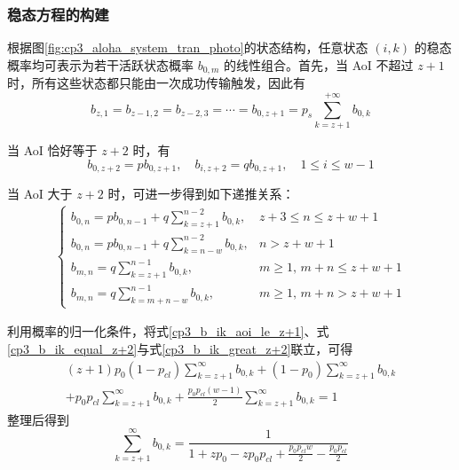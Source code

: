 \subsubsection{稳态方程的构建}

根据图\ref{fig:cp3_aloha_system_tran_photo}的状态结构，任意状态 $(i,k)$ 的稳态概率均可表示为若干活跃状态概率 $b_{0,m}$ 的线性组合。首先，当 AoI 不超过 $z+1$ 时，所有这些状态都只能由一次成功传输触发，因此有
\begin{equation} \label{cp3_b_ik_aoi_le_z+1}
    b_{z,1}=b_{z-1,2}=b_{z-2,3}=\cdots=b_{0,z+1}=p_s\sum_{k=z+1}^{+\infty}b_{0,k}
\end{equation}

当 AoI 恰好等于 $z+2$ 时，有
\begin{equation}\label{cp3_b_ik_equal_z+2}
    b_{0,z+2} = pb_{0,z+1},\quad b_{i,z+2}=qb_{0,z+1},\quad1\leq i \leq w-1
\end{equation}

当 AoI 大于 $z+2$ 时，可进一步得到如下递推关系：
\begin{equation}\label{cp3_b_ik_great_z+2}
\begin{gathered}
\begin{cases}
    \displaystyle b_{0,n} = p b_{0,n-1} + q \sum_{k=z+1}^{n-2} b_{0,k}, & z+3 \le n \le z+w+1 \\[12pt]
    \displaystyle b_{0,n} = p b_{0,n-1} + q \sum_{k=n-w}^{n-2} b_{0,k}, & n > z+w+1 \\[12pt]
    \displaystyle b_{m,n} = q \sum_{k=z+1}^{n-1} b_{0,k}, & m \ge 1, \, m+n \le z+w+1 \\[12pt]
    \displaystyle b_{m,n} = q \sum_{k=m+n-w}^{n-1} b_{0,k}, & m \ge 1, \, m+n > z+w+1
\end{cases}
\end{gathered}
\end{equation}

利用概率的归一化条件，将式\eqref{cp3_b_ik_aoi_le_z+1}、式\eqref{cp3_b_ik_equal_z+2}与式\eqref{cp3_b_ik_great_z+2}联立，可得
\begin{equation}
\begin{split}
(z+1)p_0(1-p_{cl}) \sum_{k=z+1}^{\infty} b_{0,k} + (1-p_0) \sum_{k=z+1}^{\infty} b_{0,k} \\
+ p_0 p_{cl} \sum_{k=z+1}^{\infty} b_{0,k} + \frac{p_0 p_{cl}(w-1)}{2} \sum_{k=z+1}^{\infty} b_{0,k} = 1
\end{split}
\end{equation}
整理后得到
\begin{equation}\label{cp3_sum_of_b_0k}
\sum_{k=z+1}^{\infty} b_{0,k} = \frac{1}{1 + z p_0 - z p_0 p_{cl} + \frac{p_0 p_{cl} w}{2} - \frac{p_0 p_{cl}}{2}}
\end{equation}

